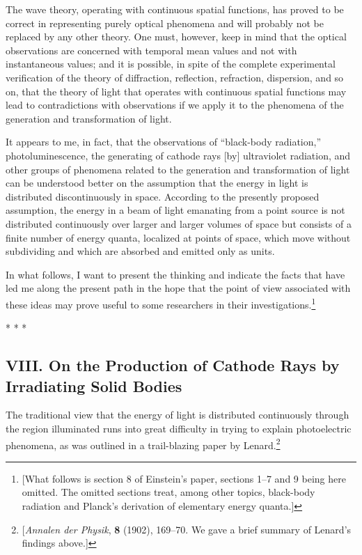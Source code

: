 The wave theory, operating with continuous spatial functions, has proved
to be correct in representing purely optical phenomena and will probably
not be replaced by any other theory. One must, however, keep in mind
that the optical observations are concerned with temporal mean values
and not with instantaneous values; and it is possible, in spite of the
complete experimental verification of the theory of diffraction,
reflection, refraction, dispersion, and so on, that the theory of light
that operates with continuous spatial functions may lead to
contradictions with observations if we apply it to the phenomena of the
generation and transformation of light.

It appears to me, in fact, that the observations of ``black-body
radiation,'' photoluminescence, the generating of cathode rays {[}by{]}
ultraviolet radiation, and other groups of phenomena related to the
generation and transformation of light can be understood better on the
assumption that the energy in light is distributed discontinuously in
space. According to the presently proposed assumption, the energy in a
beam of light emanating from a point source is not distributed
continuously over larger and larger volumes of space but consists of a
finite number of energy quanta, localized at points of space, which move
without subdividing and which are absorbed and emitted only as units.

In what follows, I want to present the thinking and indicate the facts
that have led me along the present path in the hope that the point of
view associated with these ideas may prove useful to some researchers in
their investigations.\footnote{{[}What follows is section 8 of
  Einstein's paper, sections 1--7 and 9 being here omitted. The omitted
  sections treat, among other topics, black-body radiation and Planck's
  derivation of elementary energy quanta.{]}}\\
\centerline{* * *}
%
\subsection*{VIII. On the Production of Cathode Rays by Irradiating Solid Bodies}

The traditional view that the energy of light is distributed
continuously through the region illuminated runs into great difficulty
in trying to explain photoelectric phenomena, as was outlined in a
trail-blazing paper by Lenard.\footnote{{[}\emph{Annalen der Physik}, \textbf{8}
  (1902), 169--70. We gave a brief summary of Lenard's findings above.{]}}

